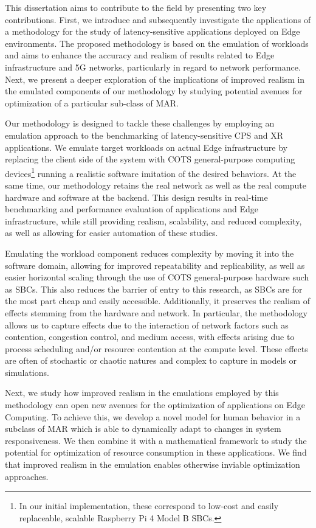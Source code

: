 This dissertation aims to contribute to the field by presenting two key contributions.
First, we introduce and subsequently investigate the applications of a methodology for the study of latency-sensitive applications deployed on Edge environments.
The proposed methodology is based on the emulation of workloads and aims to enhance the accuracy and realism of results related to Edge infrastructure and 5G networks, particularly in regard to network performance.
Next, we present a deeper exploration of the implications of improved realism in the emulated components of our methodology by studying potential avenues for optimization of a particular sub-class of \gls{MAR}.

Our methodology is designed to tackle these challenges by employing an emulation approach to the benchmarking of latency-sensitive \gls{CPS} and \gls{XR} applications. 
We emulate target workloads on actual Edge infrastructure by replacing the client side of the system with \gls{COTS} general-purpose computing devices\footnote{%
    In our initial implementation, these correspond to low-cost and easily replaceable, scalable Raspberry Pi 4 Model B \acsp{SBC}.
} running a realistic software imitation of the desired behaviors.
At the same time, our methodology retains the real network as well as the real compute hardware and software at the backend.
This design results in real-time benchmarking and performance evaluation of applications and Edge infrastructure, while still providing realism, scalability, and reduced complexity, as well as allowing for easier automation of these studies.

Emulating the workload component reduces complexity by moving it into the software domain, allowing for improved repeatability and replicability, as well as easier horizontal scaling through the use of \gls{COTS} general-purpose hardware such as \glspl{SBC}.
This also reduces the barrier of entry to this research, as \glspl{SBC} are for the most part cheap and easily accessible.
Additionally, it preserves the realism of effects stemming from the hardware and network.
In particular, the methodology allows us to capture effects due to the interaction of network factors such as contention, congestion control, and medium access, with effects arising due to process scheduling and/or resource contention at the compute level.
These effects are often of stochastic or chaotic natures and complex to capture in models or simulations.

Next, we study how improved realism in the emulations employed by this methodology can open new avenues for the optimization of applications on Edge Computing.
To achieve this, we develop a novel model for human behavior in a subclass of \gls{MAR} which is able to dynamically adapt to changes in system responsiveness.
We then combine it with a mathematical framework to study the potential for optimization of resource consumption in these applications.
We find that improved realism in the emulation enables otherwise inviable optimization approaches.


